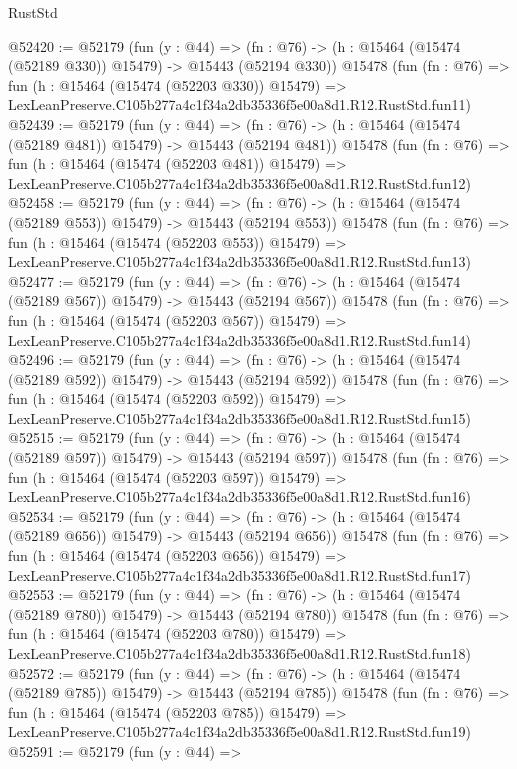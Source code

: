 \begin{lexlean}{RustStd}
\begin{coremodule}
@52420 := @52179
    (fun (y : @44) =>
    (fn : @76) -> (h : @15464 (@15474 (@52189 @330)) @15479) -> @15443 (@52194 @330))
    @15478
    (fun (fn : @76) =>
    fun (h : @15464 (@15474 (@52203 @330)) @15479) =>
    LexLeanPreserve.C105b277a4c1f34a2db35336f5e00a8d1.R12.RustStd.fun11)
@52439 := @52179
    (fun (y : @44) =>
    (fn : @76) -> (h : @15464 (@15474 (@52189 @481)) @15479) -> @15443 (@52194 @481))
    @15478
    (fun (fn : @76) =>
    fun (h : @15464 (@15474 (@52203 @481)) @15479) =>
    LexLeanPreserve.C105b277a4c1f34a2db35336f5e00a8d1.R12.RustStd.fun12)
@52458 := @52179
    (fun (y : @44) =>
    (fn : @76) -> (h : @15464 (@15474 (@52189 @553)) @15479) -> @15443 (@52194 @553))
    @15478
    (fun (fn : @76) =>
    fun (h : @15464 (@15474 (@52203 @553)) @15479) =>
    LexLeanPreserve.C105b277a4c1f34a2db35336f5e00a8d1.R12.RustStd.fun13)
@52477 := @52179
    (fun (y : @44) =>
    (fn : @76) -> (h : @15464 (@15474 (@52189 @567)) @15479) -> @15443 (@52194 @567))
    @15478
    (fun (fn : @76) =>
    fun (h : @15464 (@15474 (@52203 @567)) @15479) =>
    LexLeanPreserve.C105b277a4c1f34a2db35336f5e00a8d1.R12.RustStd.fun14)
@52496 := @52179
    (fun (y : @44) =>
    (fn : @76) -> (h : @15464 (@15474 (@52189 @592)) @15479) -> @15443 (@52194 @592))
    @15478
    (fun (fn : @76) =>
    fun (h : @15464 (@15474 (@52203 @592)) @15479) =>
    LexLeanPreserve.C105b277a4c1f34a2db35336f5e00a8d1.R12.RustStd.fun15)
@52515 := @52179
    (fun (y : @44) =>
    (fn : @76) -> (h : @15464 (@15474 (@52189 @597)) @15479) -> @15443 (@52194 @597))
    @15478
    (fun (fn : @76) =>
    fun (h : @15464 (@15474 (@52203 @597)) @15479) =>
    LexLeanPreserve.C105b277a4c1f34a2db35336f5e00a8d1.R12.RustStd.fun16)
@52534 := @52179
    (fun (y : @44) =>
    (fn : @76) -> (h : @15464 (@15474 (@52189 @656)) @15479) -> @15443 (@52194 @656))
    @15478
    (fun (fn : @76) =>
    fun (h : @15464 (@15474 (@52203 @656)) @15479) =>
    LexLeanPreserve.C105b277a4c1f34a2db35336f5e00a8d1.R12.RustStd.fun17)
@52553 := @52179
    (fun (y : @44) =>
    (fn : @76) -> (h : @15464 (@15474 (@52189 @780)) @15479) -> @15443 (@52194 @780))
    @15478
    (fun (fn : @76) =>
    fun (h : @15464 (@15474 (@52203 @780)) @15479) =>
    LexLeanPreserve.C105b277a4c1f34a2db35336f5e00a8d1.R12.RustStd.fun18)
@52572 := @52179
    (fun (y : @44) =>
    (fn : @76) -> (h : @15464 (@15474 (@52189 @785)) @15479) -> @15443 (@52194 @785))
    @15478
    (fun (fn : @76) =>
    fun (h : @15464 (@15474 (@52203 @785)) @15479) =>
    LexLeanPreserve.C105b277a4c1f34a2db35336f5e00a8d1.R12.RustStd.fun19)
@52591 := @52179
    (fun (y : @44) =>

\end{coremodule}
\end{lexlean}
